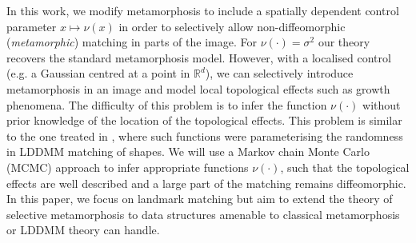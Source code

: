 \documentclass[runningheads]{llncs}
\newcommand{\Rd}{\mathbb{R}^{d}}
\begin{document}
In this work, we modify metamorphosis to include a spatially dependent control
parameter $x\mapsto\nu(x)$ in order to selectively allow non-diffeomorphic
(\emph{metamorphic}) matching in parts of the image. For $\nu(\cdot) = \sigma^2$
our theory recovers the standard metamorphosis model. However, with a localised
control (e.g. a Gaussian centred at a point in $\Rd$), we can selectively
introduce metamorphosis in an image and model local topological effects such as
growth phenomena. The difficulty of this problem is to infer the function
$\nu(\cdot)$ without prior knowledge of the location of the topological effects.
This problem is similar to the one treated in \cite{arnaudon_geometric_2017},
where such functions were parameterising the randomness in LDDMM matching of
shapes.  We will use a Markov chain Monte Carlo (MCMC) approach to infer
appropriate functions $\nu(\cdot)$, such that the topological effects are well
described and a large part of the matching remains diffeomorphic. In this paper,
we focus on landmark matching but aim to extend the theory of selective
metamorphosis to data structures amenable to classical metamorphosis or LDDMM
theory can handle.
\end{document}
